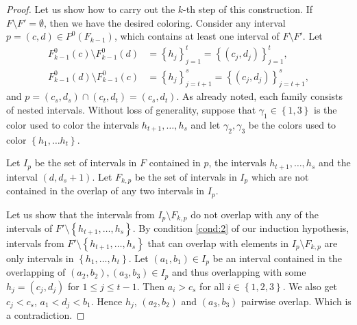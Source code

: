 \documentclass[12pt]{article}
\theoremstyle{definition}
\begin{document}
\begin{proof}
        Let us show how to carry out the 
        $k$-th step of this construction.
        If $F \setminus F' = \emptyset$,
        then we have 
        the desired coloring.
        Consider any interval
        $p = \left(c, d\right)
        \in P^{0}\left(F_{k-1}\right)$,
        which contains at least one interval
        of $F \setminus F'$. 
        Let
        \begin{align*}
            F^{0}_{k-1}\left(c\right) \setminus 
            F^{0}_{k-1}\left(d\right)
            &= \left\{h_{j}\right\}_{j=1}^{t}
            = \left\{\left(c_{j},
            d_{j}\right)\right\}_{j=1}^{t}, \\
            F^{0}_{k-1}\left(d\right) \setminus 
            F^{0}_{k-1} \left(c\right)
            &= \left\{h_{j}\right\}_{j=t+1}^{s}
            = \left\{\left(c_{j},
            d_{j}\right)\right\}_{j=t+1}^{s},
        \end{align*}
        and $p = \left(c_{s}, d_{s}\right)
        \cap \left(c_{t}, d_{t}\right) = 
        \left(c_{s}, d_{t}\right)$.
        As already noted, 
        each
        family consists of
        nested intervals.
        Without loss of generality,
        suppose that
        $\gamma_1 \in \left\{1, 3\right\}$
        is the color used to
        color the intervals
        $h_{t+1}, \ldots, h_{s}$
        and 
        let $\gamma_{2}, \gamma_{3}$
        be the colors used to 
        color
        $\left\{h_1, \ldots h_t\right\}$.
        
        Let $I_{p}$ be the
        set of intervals in $F$ 
        contained in $p$,
        the intervals $h_{t+1},
        \ldots, h_{s}$ and the 
        interval 
        $\left(d, d_{s} + 1\right)$.
        Let $F_{k, p}$ be 
        the set of intervals in $I_{p}$ 
        which are not contained in
        the overlap of any two
        intervals in $I_{p}$. 

        Let us show that the 
        intervals from $I_{p}
        \setminus F_{k, p}$ 
        do 
        not overlap with 
        any of the intervals of
        $F' \setminus \left\{
        h_{t+1},\ldots,h_{s}\right\}$.
        By condition \ref{cond:2}
        of our induction hypothesis, 
        intervals from
        $F' \setminus \left\{h_{t+1},
        \ldots, h_{s}\right\}$
        that can overlap with 
        elements in $I_{p} \setminus 
        F_{k,p}$ 
        are only intervals
        in $\left\{h_1, \ldots, h_{t}\right\}$.
        Let $\left(a_1, b_1\right) \in I_{p}$ 
        be an interval contained in the
        overlapping of
        $\left(a_2, b_2\right), 
        \left(a_3, b_3\right)
        \in I_{p}$ and thus
        overlapping with some
        $h_{j} =\left(c_{j}, d_{j}\right)$ 
        for $1 \leq j \leq t-1$.
        Then $a_{i} > c_{s}$ for
        all $i \in \left\{1, 2, 3\right\}$.
        We also get $c_{j} < c_{s}$,
        $a_1 < d_{j} < b_1$. Hence
        $h_{j}$, $\left(a_2, b_2\right)$ 
        and $\left(a_3, b_3\right)$ 
        pairwise overlap.
        Which is a contradiction.


\end{proof}
\end{document}

